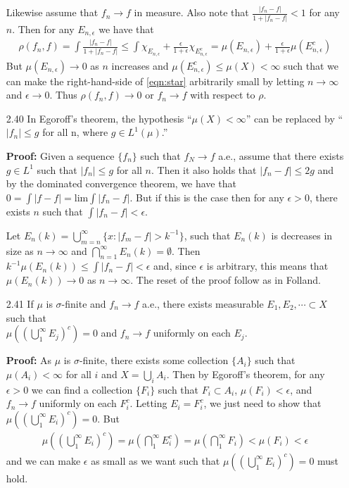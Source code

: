 \documentclass[11pt,letter]{article}
\begin{document}
\begin{enumerate}
    Likewise assume that $f_n \rightarrow f$ in measure. Also note that $\frac{|f_n - f|}{1 + |f_n - f|} < 1$ for any $n$. Then for any $E_{n,\epsilon}$ we have that
    \begin{align*}
        \rho(f_n,f) = \int \frac{|f_n - f|}{1 + |f_n - f|} \le \int \chi_{E_{n,\epsilon}} + \frac{\epsilon}{1 + \epsilon} \chi_{E_{n,\epsilon}^c} = \mu(E_{n,\epsilon}) + \frac{\epsilon}{1 + \epsilon} \mu(E_{n,\epsilon}^c) \label{eqn:star} \tag{$\star$}
    \end{align*}
    But $\mu(E_{n,\epsilon}) \rightarrow 0$ as $n$ increases and $\mu(E_{n,\epsilon}^c) \le \mu(X) < \infty$ such that we can make the right-hand-side of \eqref{eqn:star} arbitrarily small by letting $n \rightarrow \infty$ and $\epsilon \rightarrow 0$. Thus $\rho(f_n, f) \rightarrow 0$ or $f_n \rightarrow f$ with respect to $\rho$.


    \item[2.40] In Egoroff's theorem, the hypothesis ``$\mu(X) < \infty$'' can be replaced by ``$|f_n| \le g$ for all n, where $g \in L^1(\mu)$.''
     
    \textbf{Proof:} Given a sequence $\{f_n\}$ such that $f_N \rightarrow f$ a.e., assume that there exists $g \in L^1$ such that $|f_n| \le g$ for all $n$. Then it also holds that $|f_n -    f| \le 2g$ and by the dominated convergence theorem, we have that $0 = \int |f - f| = \text{lim} \int |f_n - f|$. But if this is the case then for any $\epsilon >  0$, there exists $n$ such that $\int |f_n - f| < \epsilon$.

    Let $E_n(k) = \bigcup_{m=n}^\infty \{x: |f_m - f| > k^{-1}\}$, such that $E_n(k)$ is decreases in size as $n \rightarrow \infty$ and $\bigcap_{n=1}^\infty E_n(k) = \emptyset$. Then $k^{-1}\mu(E_n(k)) \le \int |f_n - f| < \epsilon$ and, since $\epsilon$ is arbitrary, this means that $\mu(E_n(k)) \rightarrow 0$ as $n \rightarrow \infty$. The reset of the proof follow as in Folland.
    
    \item[2.41] If $\mu$ is $\sigma$-finite and $f_n \rightarrow f$ a.e., there exists measurable $E_1, E_2, \cdots \subset X$ such that \\ $\mu((\bigcup_1^\infty E_j)^c) = 0$ and $f_n \rightarrow f$ uniformly on each $E_j$.
    
    \textbf{Proof:} As $\mu$ is $\sigma$-finite, there exists some collection $\{A_i\}$ such that $\mu(A_i) < \infty$ for all $i$ and $X = \bigcup_i A_i$. Then by Egoroff's theorem, for any $\epsilon > 0$ we can find a collection $\{F_i\}$ such that $F_i \subset A_i$, $\mu(F_i) < \epsilon$, and $f_n \rightarrow f$ uniformly on each $F_i^c$. Letting $E_i = F_i^c$, we just need to show that $\mu((\bigcup_1^\infty E_i)^c) = 0$. But
    \begin{align*}
        \mu((\bigcup_1^\infty E_i)^c) = \mu(\bigcap_1^\infty E_i^c) = \mu(\bigcap_1^\infty F_i) < \mu(F_i) < \epsilon
    \end{align*}
    and we can make $\epsilon$ as small as we want such that $\mu((\bigcup_1^\infty E_i)^c) = 0$ must hold.
    

\end{enumerate}
\end{document}
